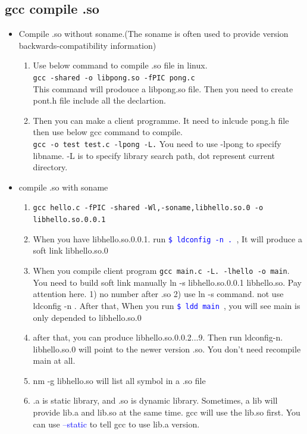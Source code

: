 \documentclass[a4paper,12pt,twoside]{book}
\newcommand{\linuxcommand}[1]{\texttt{\textcolor{blue}{\$ #1 \Pisymbol{psy}{191}}}}
\newcommand{\op}[1]{\textcolor{blue}{-#1}}
\begin{document}
\subsection{gcc compile .so}
  \begin{itemize}

		  \item Compile .so without soname.(The soname is often used to provide version backwards-compatibility information)

	\begin{enumerate}
	\item Use below command to compile .so file in linux. \\
   \verb=gcc -shared -o libpong.so -fPIC pong.c= \\
   This command will prodouce a libpong.so file. Then you need to create pont.h file include all the declartion. 
   
   \item Then you can make a client programme. It need to inlcude pong.h file then use below gcc command to compile. \\
	\verb=gcc -o test test.c -lpong -L.=
	You need to use -lpong to specify libname. -L is to specify library search path, dot represent current directory.        
	\end{enumerate}

       \item compile .so with soname 
       \begin{enumerate}
		\item \verb=gcc hello.c -fPIC -shared -Wl,-soname,libhello.so.0 -o libhello.so.0.0.1= 
		
		\item When you have libhello.so.0.0.1. run \linuxcommand{ldconfig -n .}, It will produce a soft link libhello.so.0
		\item When you compile client program
		\verb=gcc main.c -L. -lhello -o main=. You need to build soft link manually 
		ln -s libhello.so.0.0.1 libhello.so. Pay attention here. 1) no number after .so 2) use ln -s command. not use ldconfig -n . After that, When you run \linuxcommand{ldd main}, you will see main is only depended to libhello.so.0
		
		\item after that, you can produce libhello.so.0.0.2...9. Then run ldconfig-n. libhello.so.0 will point to the newer version .so. You don't need recompile main at all.  

		\item nm -g libhello.so will list all symbol in a .so file
		
		  \item .a is static library, and .so is dynamic library. Sometimes, a lib will provide lib.a and lib.so at the same time. gcc will use the lib.so first. You can use \op{-static} to tell gcc to use lib.a version.
	\end{enumerate}
	
\end{itemize}
\end{document}
